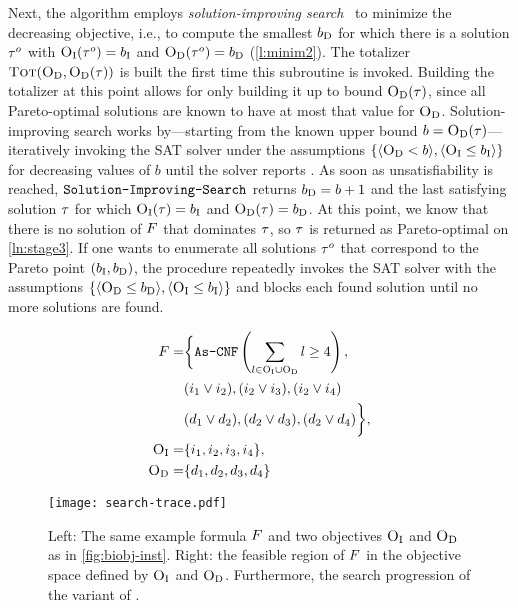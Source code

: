 Next, the algorithm employs \emph{solution-improving search}~\autocites{handbook2-maxsat,DBLP:journals/jsat/BerreP10,DBLP:journals/jsat/EenS06} to minimize the decreasing objective, i.e., to compute the smallest $b_{\text{D}}$ for which there is a solution $\tau^o$ with $\textsc{O}_{\text{I}}(\tau^o) = b_{\text{I}}$ and $\textsc{O}_{\text{D}}(\tau^o) = b_{\text{D}}$ (\cref{l:minim2}).
The totalizer $\textsc{Tot}(\textsc{O}_{\text{D}}, \textsc{O}_{\text{D}}(\tau))$ is built the first time this subroutine is invoked.
Building the totalizer at this point allows for only building it up to bound $\textsc{O}_{\text{D}}(\tau)$, since all Pareto-optimal solutions are known to have at most that value for $\textsc{O}_{\text{D}}$.
Solution-improving search works by---starting from the known upper bound $b=\textsc{O}_{\text{D}}(\tau)$---iteratively invoking the SAT solver under the assumptions $\{\langle \textsc{O}_{\text{D}} < b \rangle, \langle \textsc{O}_{\text{I}} \leq b_{\text{I}} \rangle\}$ for decreasing values of $b$ until the solver reports \unsat{}.
As soon as unsatisfiability is reached, $\texttt{Solution-\allowbreak{}Improving-\allowbreak{}Search}$ returns $b_{\text{D}}=b+1$ and the last satisfying solution $\tau$ for which $\textsc{O}_{\text{I}}(\tau) = b_{\text{I}}$ and $\textsc{O}_{\text{D}}(\tau) = b_{\text{D}}$.
At this point, we know that there is no solution of $F$ that dominates $\tau$, so $\tau$ is returned as Pareto-optimal on \cref{ln:stage3}.
If one wants to enumerate all solutions $\tau^o$ that correspond to the Pareto point $(b_{\text{I}},b_{\text{D}})$, the \E{} procedure repeatedly invokes the SAT solver with the assumptions $\{\langle \textsc{O}_{\text{D}} \leq b_{\text{D}} \rangle, \langle \textsc{O}_{\text{I}} \leq b_{\text{I}} \rangle\}$ and blocks each found solution until no more solutions are found.

\begin{figure}
  \begin{minipage}{0.377\textwidth}
    \small
    \begin{align*}
      F = &\bigg\{ \texttt{As-CNF}\left(\sum_ {l \in \textsc{O}_{\text{I}} \cup \textsc{O}_{\text{D}}} l \geq 4 \right), \\
        &(i_1 \lor i_2), (i_2 \lor i_3), (i_2 \lor i_4) \\
        &(d_1 \lor d_2), (d_2 \lor d_3), (d_2 \lor d_4) \bigg\}, \\
      \textsc{O}_{\text{I}} =&\{ i_1, i_2, i_3, i_4 \}, \\
      \textsc{O}_{\text{D}} =&\{ d_1, d_2, d_3, d_4 \} 
    \end{align*}
  \end{minipage}
  \;
  \begin{minipage}{0.605\textwidth}
    \texttt{[image: search-trace.pdf]}
  \end{minipage}
  \caption{Left: The same example formula $F$ and two objectives $\textsc{O}_{\text{I}}$ and $\textsc{O}_{\text{D}}$ as in \cref{fig:biobj-inst}.
    Right: the feasible region of $F$ in the objective space defined by $\textsc{O}_{\text{I}}$ and $\textsc{O}_{\text{D}}$.
    Furthermore, the search progression of the \satunsat{} variant of \algname{}.\label{fig:search-trace}}
\end{figure}

